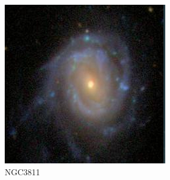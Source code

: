 \documentclass[9pt]{revtex4-1}
\begin{document}
\begin{figure}
\includegraphics[scale=0.3]{NGC3811.png}
\caption{NGC3811}
\end{figure}

\end{document}
